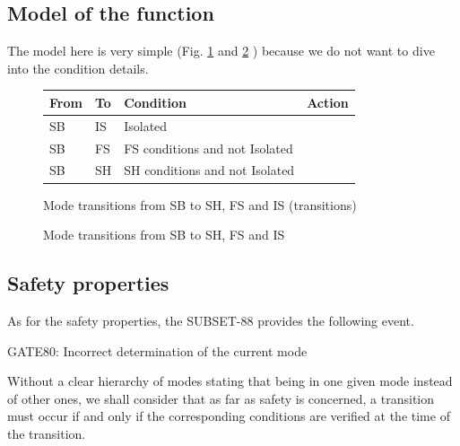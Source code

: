 \documentclass{template/openetcs_article}
\begin{document}
\subsection{Model of the function}
The model here is very simple (Fig. \ref{fig:trans_sb_tab} and \ref{fig:trans_sb} ) 
because we do not want to dive into the condition details.

\begin{figure}
\centering
\small
\begin{tabular}{|l|l||p{3.5cm}|p{3.5cm}|}
\hline
\bf From & \bf To & \bf Condition & \bf Action \\
\hline
SB & IS & Isolated &  \\
\hline
SB & FS & FS conditions and not Isolated &  \\
\hline
SB & SH & SH conditions and not Isolated &  \\
\hline
\end{tabular}
\normalsize
\caption{Mode transitions from SB to SH, FS and IS (transitions)}
\label{fig:trans_sb_tab}
\end{figure}

\begin{figure}
  \centering
  \caption{Mode transitions from SB to SH, FS and IS}
  \label{fig:trans_sb}
\end{figure}

\subsection{Safety properties}
As for the safety properties, the SUBSET-88 provides the following event. 
\begin{center}
GATE80: Incorrect determination of the current mode
\end{center}
Without a clear hierarchy of modes stating that being in one given mode instead of other ones, we 
shall consider that as far as safety is concerned, a transition must occur if and only if the 
corresponding conditions are verified at the time of the transition.
\end{document}
